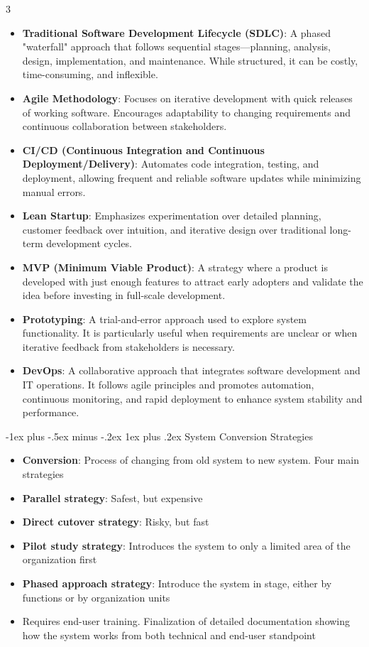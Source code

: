 \documentclass[10pt, landscape]{article}
\makeatletter
\renewcommand{\subsubsection}{\@startsection{subsubsection}{3}{0mm}%
                                {-1ex plus -.5ex minus -.2ex}%
                                {1ex plus .2ex}%
                                {\normalfont\small\bfseries}}
\makeatother
\begin{document}
\begin{multicols*}{3}
\begin{itemize}
    \item \textbf{Traditional Software Development Lifecycle (SDLC)}: A phased "waterfall" approach that follows sequential stages—planning, analysis, design, implementation, and maintenance. While structured, it can be costly, time-consuming, and inflexible.
    \item \textbf{Agile Methodology}: Focuses on iterative development with quick releases of working software. Encourages adaptability to changing requirements and continuous collaboration between stakeholders.
    \item \textbf{CI/CD (Continuous Integration and Continuous Deployment/Delivery)}: Automates code integration, testing, and deployment, allowing frequent and reliable software updates while minimizing manual errors.
    \item \textbf{Lean Startup}: Emphasizes experimentation over detailed planning, customer feedback over intuition, and iterative design over traditional long-term development cycles.
    \item \textbf{MVP (Minimum Viable Product)}: A strategy where a product is developed with just enough features to attract early adopters and validate the idea before investing in full-scale development.
    \item \textbf{Prototyping}: A trial-and-error approach used to explore system functionality. It is particularly useful when requirements are unclear or when iterative feedback from stakeholders is necessary.
    \item \textbf{DevOps}: A collaborative approach that integrates software development and IT operations. It follows agile principles and promotes automation, continuous monitoring, and rapid deployment to enhance system stability and performance.
\end{itemize}

\subsubsection{System Conversion Strategies}
\begin{itemize}
  \item \textbf{Conversion}:  Process of changing from old system to new system. Four main strategies
    \item \textbf{Parallel strategy}:    Safest, but expensive
    \item \textbf{Direct cutover strategy}:    Risky, but fast
    \item \textbf{Pilot study strategy}:    Introduces the system to only a limited area of the organization first
    \item \textbf{Phased approach strategy}:    Introduce the system in stage, either by functions or by organization units
  \item Requires end-user training. Finalization of detailed documentation showing how the system works from both technical and end-user standpoint
\end{itemize}



\end{multicols*}
\end{document}
